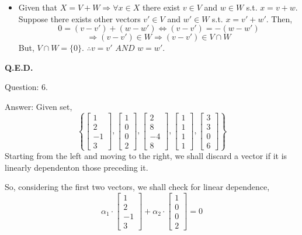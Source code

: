 \documentclass[a4paper]{article}
\begin{document}
\begin{qalist}
\begin{itemize}[label=$\rightarrow$]
				\item Given that $X = V + W \Rightarrow \forall x \in X$ there exist $v \in V$ and $w \in W$ s.t. $x = v + w$.
					Suppose there exists other vectors $v' \in V$ and $w' \in W$ s.t. $x = v' + w'$. Then, 
					\[0 = (v - v') + (w - w')\Leftrightarrow(v - v') = -(w - w')\]
					\[\Rightarrow (v - v') \in W \Rightarrow (v-v') \in V\cap W\]
					But, $V \cap W = \{0\}$. $\therefore v = v' \textit{ AND } w = w'$.
			\end{itemize}
			\textbf{Q.E.D.}
		
		\item[Question: 6.] \setcounter{equation}{0} %
		\item[Answer:] Given set, 
			\begin{equation}
				\left\{ \left[\begin{matrix}1 \\ 2 \\ -1 \\ 3\end{matrix}\right], 
					\left[\begin{matrix}1 \\ 0 \\ 0 \\ 2\end{matrix}\right], 
					\left[\begin{matrix}2 \\ 8 \\ -4 \\ 8\end{matrix}\right],
					\left[\begin{matrix}1 \\ 1 \\ 1 \\ 1\end{matrix}\right],
					\left[\begin{matrix}3 \\ 3 \\ 0 \\ 6\end{matrix}\right]
				\right\}
			\end{equation}
			Starting from the left and moving to the right, we shall discard a vector if it is linearly dependenton those preceding it.
			
			So, considering the first two vectors, we shall check for linear dependence, 
			\begin{equation}
				{\alpha}_{1}\cdot\left[\begin{matrix}1 \\ 2 \\ -1 \\ 3\end{matrix}\right] + 
				{\alpha}_{2}\cdot\left[\begin{matrix}1 \\ 0 \\ 0 \\ 2\end{matrix}\right]
				 = 0
			\end{equation}
			

\end{qalist}
\end{document}
